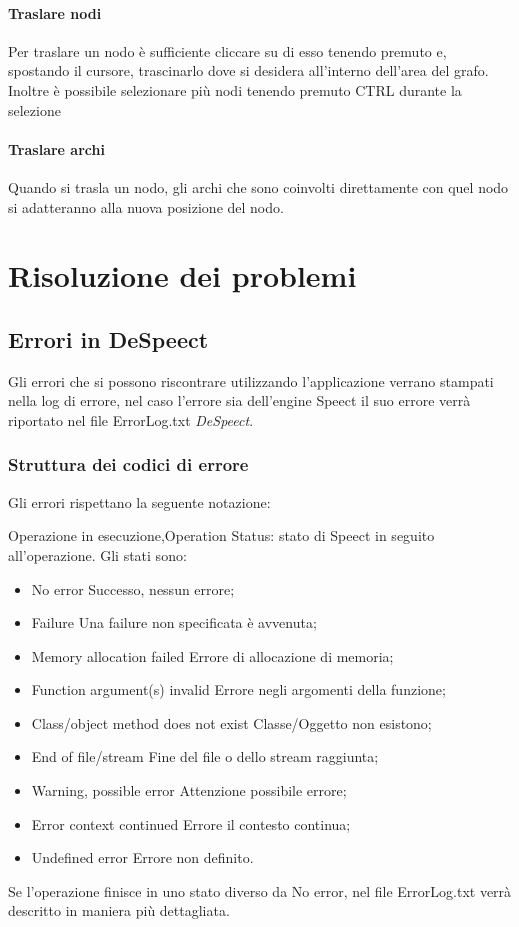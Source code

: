 \documentclass[openany,12pt,a4paper]{report}
\begin{document}
	\subsubsection{Traslare nodi}
	Per traslare un nodo è sufficiente cliccare su di esso tenendo premuto e, spostando il cursore, trascinarlo dove si desidera all'interno dell'area del grafo.
	Inoltre è possibile selezionare più nodi tenendo premuto CTRL durante la selezione
	
	\subsubsection{Traslare archi}
	Quando si trasla un nodo, gli archi che sono coinvolti direttamente con quel nodo si adatteranno alla nuova posizione del nodo.
	
	\chapter{Risoluzione dei problemi}
	
	\section{Errori in DeSpeect}
	Gli errori che si possono riscontrare utilizzando l’applicazione verrano stampati nella log di errore, nel caso l'errore sia dell'engine Speect il suo errore verrà riportato nel file ErrorLog.txt \textit{DeSpeect}.
	\subsection{Struttura dei codici di errore}
	Gli errori rispettano la seguente notazione:
	
	\begin{center}
		Operazione in esecuzione,Operation Status: stato di Speect in seguito all'operazione.
		Gli stati sono:
		\begin{itemize}
			\item {No error} Successo, nessun errore;
			\item {Failure} Una failure non specificata è avvenuta;
			\item {Memory allocation failed} Errore di allocazione di memoria;
			\item {Function argument(s) invalid} Errore negli argomenti della funzione;
			\item {Class/object method does not exist} Classe/Oggetto non esistono;
			\item {End of file/stream} Fine del file o dello stream raggiunta;
			\item {Warning, possible error} Attenzione possibile errore;
			\item {Error context continued} Errore il contesto continua;
			\item {Undefined error} Errore non definito.
		\end{itemize}
	 	Se l'operazione finisce in uno stato diverso da No error, nel file ErrorLog.txt verrà descritto in maniera più dettagliata.
	\end{center}
	
\end{document}
